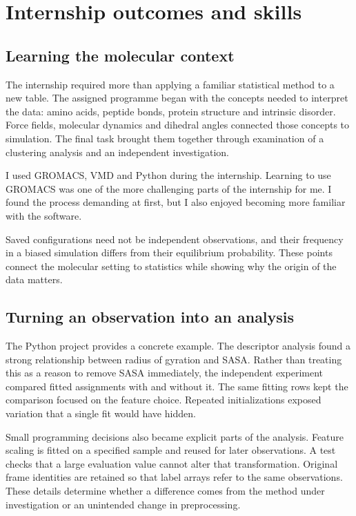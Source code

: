 \chapter{Internship outcomes and skills}
\section{Learning the molecular context}
The internship required more than applying a familiar statistical method to a new table. The assigned programme began with the concepts needed to interpret the data: amino acids, peptide bonds, protein structure and intrinsic disorder. Force fields, molecular dynamics and dihedral angles connected those concepts to simulation. The final task brought them together through examination of a clustering analysis and an independent investigation.

I used GROMACS, VMD and Python during the internship. Learning to use GROMACS was one of the more challenging parts of the internship for me. I found the process demanding at first, but I also enjoyed becoming more familiar with the software.

Saved configurations need not be independent observations, and their frequency in a biased simulation differs from their equilibrium probability. These points connect the molecular setting to statistics while showing why the origin of the data matters.

\section{Turning an observation into an analysis}
The Python project provides a concrete example. The descriptor analysis found a strong relationship between radius of gyration and SASA. Rather than treating this as a reason to remove SASA immediately, the independent experiment compared fitted assignments with and without it. The same fitting rows kept the comparison focused on the feature choice. Repeated initializations exposed variation that a single fit would have hidden.

Small programming decisions also became explicit parts of the analysis. Feature scaling is fitted on a specified sample and reused for later observations. A test checks that a large evaluation value cannot alter that transformation. Original frame identities are retained so that label arrays refer to the same observations. These details determine whether a difference comes from the method under investigation or an unintended change in preprocessing.


